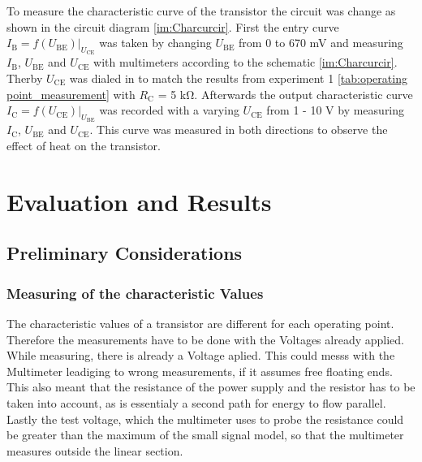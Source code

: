 \documentclass[11pt, a4paper]{article}
\begin{document}
To measure the characteristic curve of the transistor the circuit was change as shown in the circuit diagram \ref{im:Charcurcir}. 
First the entry curve $I_{\text{B}}=f(U_{\text{BE}})|_{U_{\text{CE}}}$ was taken by changing $U_{\text{BE}}$ from 0 to 670 \si{\milli\volt} and measuring $I_{\text{B}}$,
$U_{\text{BE}}$ and $U_{\text{CE}}$ with multimeters according to the schematic \ref{im:Charcurcir}. Therby $U_{\text{CE}}$ was dialed in to match the results from experiment 1 \ref{tab:operating point_measurement} with $R_{\text{C}}$ = 5 \si{\kilo\ohm}.
Afterwards the output characteristic curve $I_{\text{C}} = f(U_{\text{CE}})|_{U_{\text{BE}}}$ was recorded with a varying $U_{\text{CE}}$ from 1 - 10 \si{\volt} by measuring $I_{\text{C}}$, $U_{\text{BE}}$ and $U_{\text{CE}}$. This curve was measured in both directions to observe the effect of heat on the transistor.

\section{Evaluation and Results}
\subsection{Preliminary Considerations}

\subsubsection{Measuring of the characteristic Values}
The characteristic values of a transistor are different for each operating point. Therefore the measurements have to be done with the Voltages already applied. While measuring, there is already a Voltage aplied. This could messs with the Multimeter leadiging to wrong measurements, if it assumes free floating ends. This also meant that the resistance of the power supply and the resistor has to be taken into account, as is essentialy a second path for energy to flow parallel. Lastly the test voltage, which the multimeter uses to probe the resistance could be greater than the maximum of the small signal model, so that the multimeter measures outside the linear section.
\end{document}
